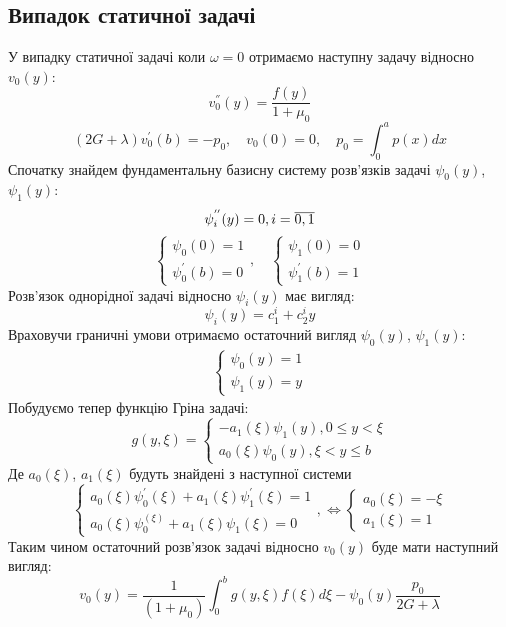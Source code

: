 \subsection*{Випадок статичної задачі}
У випадку статичної задачі коли $\omega = 0$ отримаємо наступну задачу відносно $v_0(y)$:
\begin{equation*}
    v_0^{''}(y) = \frac{f(y)}{1+\mu_0}
\end{equation*}
\begin{equation*}
    (2G + \lambda)v_0^{'}(b) = -p_0, \quad v_0(0) = 0, \quad p_0 = \int_{0}^{a}p(x)dx
\end{equation*}
Спочатку знайдем фундаментальну базисну систему розв'язків задачі $\psi_0(y)$, $\psi_1(y)$:
\begin{equation*}
    \psi_i^{''}(y) = 0, i=\overline{0,1} \\
\end{equation*}
\begin{equation*}
    \begin{cases}
        \psi_0(0) = 1 \\
        \psi_0^{'}(b) = 0
    \end{cases}, \quad
    \begin{cases}
        \psi_1(0) = 0 \\
        \psi_1^{'}(b) = 1
    \end{cases}
\end{equation*}
Розв'язок однорідної задачі відносно $\psi_i(y)$ має вигляд:
\begin{equation}
    \psi_i(y) = c_1^i + c_2^i y 
\end{equation}
Враховучи граничні умови отримаємо остаточний вигляд $\psi_0(y)$, $\psi_1(y)$:
\begin{align*}
    \begin{cases}
        \psi_0(y) = 1 \\
        \psi_1(y) = y
    \end{cases}
\end{align*}
Побудуємо тепер функцію Гріна задачі:
\begin{equation*}
    g(y, \xi) = \begin{cases}
        -a_1(\xi) \psi_1(y), 0 \le y < \xi \\
        a_0(\xi) \psi_0(y), \xi < y \le b
    \end{cases}
\end{equation*}
Де $a_0(\xi)$, $a_1(\xi)$ будуть знайдені з наступної системи
\begin{equation*}
    \begin{cases}
        a_0(\xi) \psi_0^{'}(\xi) + a_1(\xi) \psi_1^{'}(\xi) = 1 \\
        a_0(\xi) \psi_0^(\xi) + a_1(\xi) \psi_1(\xi) = 0
    \end{cases}, \Leftrightarrow
    \begin{cases}
        a_0(\xi) = -\xi \\
        a_1(\xi) = 1
    \end{cases}
\end{equation*}
Таким чином остаточний розв'язок задачі відносно $v_0(y)$ буде мати наступний вигляд:
\begin{equation*}
    v_0(y) = \frac{1}{(1+\mu_0)} \int_{0}^{b}g(y,\xi) f(\xi) d\xi - \psi_0(y) \frac{p_0}{2G + \lambda}
\end{equation*}